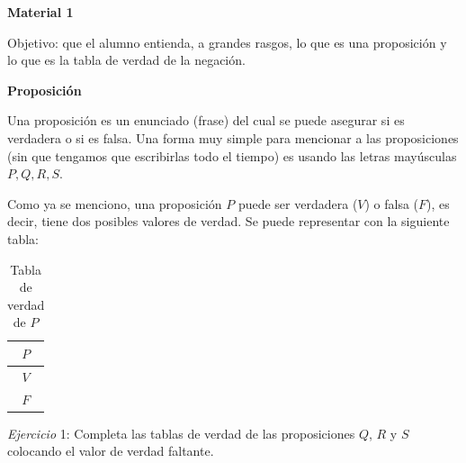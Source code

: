 \documentclass[letterpaper, twoside]{article}
\begin{document}

\begin{center}
  \textbf{\large Material 1}
\end{center}

\vspace{.5cm}

Objetivo: que el alumno entienda, a grandes rasgos, lo que es una proposición y lo que es la tabla de verdad de la negación.

\vspace{.5cm}

\textbf{Proposición}

Una proposición es un enunciado (frase) del cual se puede asegurar si es verdadera o si es falsa. Una forma muy simple para mencionar a las proposiciones (sin que tengamos que escribirlas todo el tiempo) es usando las letras mayúsculas $P,Q,R,S$.\par

\vspace{.5cm}

Como ya se menciono, una proposición $P$ puede ser verdadera ($V$) o falsa ($F$), es decir, tiene dos posibles valores de verdad. Se puede representar con la siguiente tabla:\par

\vspace{.5cm}

\begin{table}[h]
  \centering
    \begin{tabular}{|c|}
      \hline
      $P$ \\ \hline
      $V$ \\ \hline
      $F$ \\
      \hline
    \end{tabular}
  \caption*{Tabla de verdad de $P$}
\end{table}

\vspace{1cm}

\textit{Ejercicio} 1: Completa las tablas de verdad de las proposiciones $Q$, $R$ y $S$ colocando el valor de verdad faltante.

\vspace{.5cm}
\end{document}
